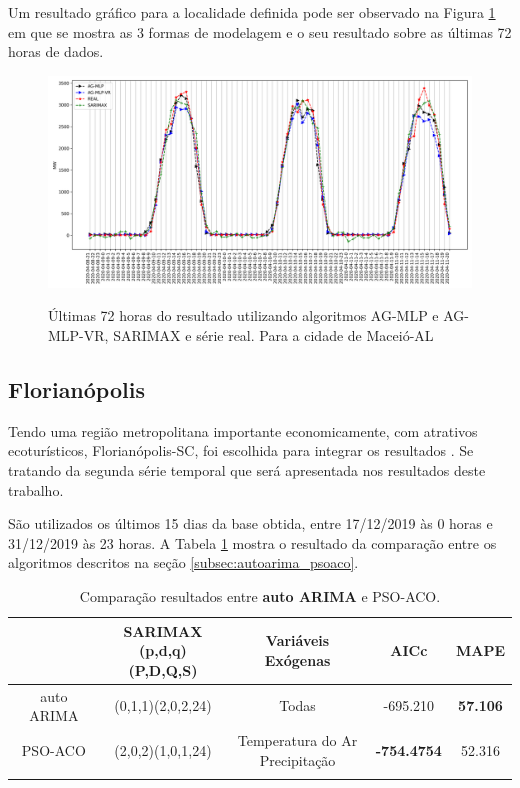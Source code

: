 Um resultado gráfico para a localidade definida pode ser observado na Figura \ref{fig:cap4_maceio_3_days_hibrids} em que se mostra as 3 formas de modelagem e o seu resultado sobre as últimas 72 horas de dados.

\begin{figure}[!htbp]
    \centering
    \caption{Últimas 72 horas do resultado utilizando algoritmos AG-MLP e AG-MLP-VR, SARIMAX e série real. Para a cidade de Maceió-AL}
    \includegraphics[width=\textwidth]{Figuras/results/comparison_hibrids_mc.png}
    \label{fig:cap4_maceio_3_days_hibrids}
\end{figure}

\subsection{Florianópolis}

Tendo uma região metropolitana importante economicamente, com atrativos ecoturísticos, Florianópolis-SC, foi escolhida para integrar os resultados \cite{bittencourt2015ecoturismo, cavanus2021sapiens}. Se tratando da segunda série temporal que será apresentada nos resultados deste trabalho.

São utilizados os últimos 15 dias da base obtida, entre 17/12/2019 às 0 horas e 31/12/2019 às 23 horas. A Tabela \ref{tab:cap4_comp_flor_autoarima_psoaco} mostra o resultado da comparação entre os algoritmos descritos na seção \ref{subsec:autoarima_psoaco}.

\begin{table}[htbp]
\caption{Comparação resultados entre \textbf{auto ARIMA} e PSO-ACO.}
\begin{center}
\begin{tabular}{ccccc}
                    & \Longstack{SARIMAX \\ (p,d,q)(P,D,Q,S)} & Variáveis Exógenas & AICc & MAPE  \\\hline
auto ARIMA & (0,1,1)(2,0,2,24) & Todas & -695.210 & \textbf{57.106} \\\hline
PSO-ACO             & (2,0,2)(1,0,1,24) & \Longstack{Temperatura do Ar \\ Precipitação} & \textbf{-754.4754} & 52.316 \\\hline
\label{tab:cap4_comp_flor_autoarima_psoaco}
\end{tabular}
\end{center}
\end{table}

